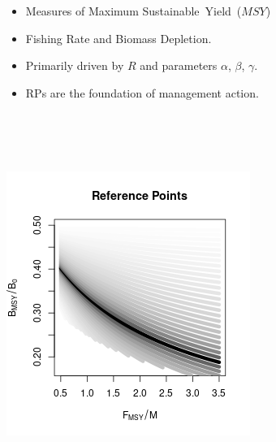 \documentclass[a0paper,portrait]{baposter}
\begin{document}
\begin{poster}
{\begin{minipage}[h!]{0.55\textwidth}
        \begin{minipage}[b]{0.5\textwidth}
	\begin{itemize}[leftmargin=*]
		\raggedright
		\item Measures of Maximum \mbox{Sustainable Yield ($MSY$)}
		\item Fishing Rate and Biomass Depletion. %
		\item Primarily driven by $R$ and parameters $\alpha$, $\beta$, $\gamma$.
                \item RPs are the foundation of management action.
        \end{itemize}
	$~$\\$~$\\$~$\\
	\end{minipage}
        \begin{minipage}[b]{0.48\textwidth}
	\includegraphics[width=\textwidth]{../../ddBias/rpCurves.png} %

\end{minipage}
\end{minipage}}
\end{poster}
\end{document}
